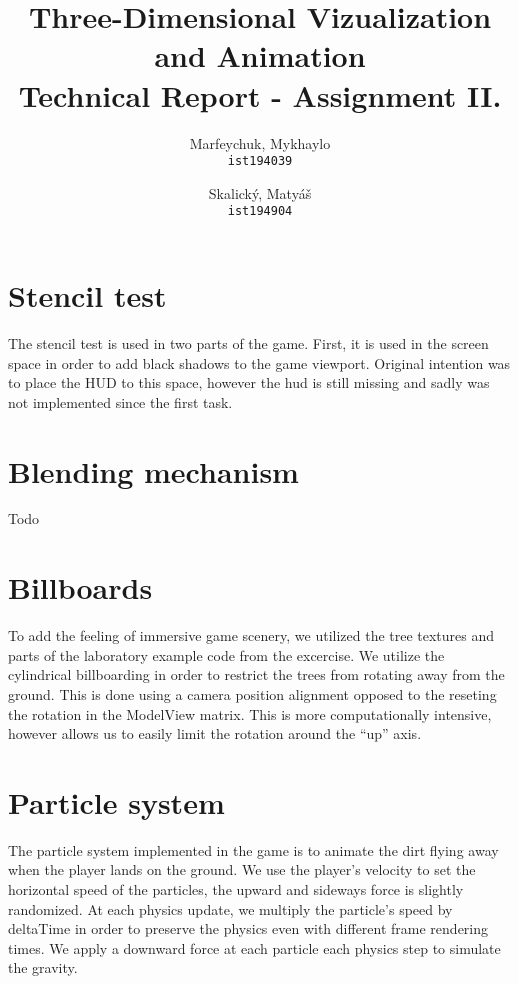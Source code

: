 \documentclass[a4paper,10pt]{article}
\title{Three-Dimensional Vizualization and Animation\\Technical Report - Assignment II.}
\author{
  Marfeychuk, Mykhaylo\\
  \texttt{ist194039}
  \and
  Skalický, Matyáš\\
  \texttt{ist194904}
}
\date{} %
\begin{document}
\maketitle


\section{Stencil test}
The stencil test is used in two parts of the game. First, it is used in the screen space in order to add black shadows to the game viewport. Original intention was to place the HUD to this space, however the hud is still missing and sadly was not implemented since the first task.

\section{Blending mechanism}
Todo

\section{Billboards}
To add the feeling of immersive game scenery, we utilized the tree textures and parts of the laboratory example code from the excercise. We utilize the cylindrical billboarding in order to restrict the trees from rotating away from the ground. This is done using a camera position alignment opposed to the reseting the rotation in the ModelView matrix. This is more computationally intensive, however allows us to easily limit the rotation around the ``up'' axis.

\section{Particle system}
The particle system implemented in the game is to animate the dirt flying away when the player lands on the ground. We use the player's velocity to set the horizontal speed of the particles, the upward and sideways force is slightly randomized. At each physics update, we multiply the particle's speed by deltaTime in order to preserve the physics even with different frame rendering times. We apply a downward force at each particle each physics step to simulate the gravity.
\end{document}
